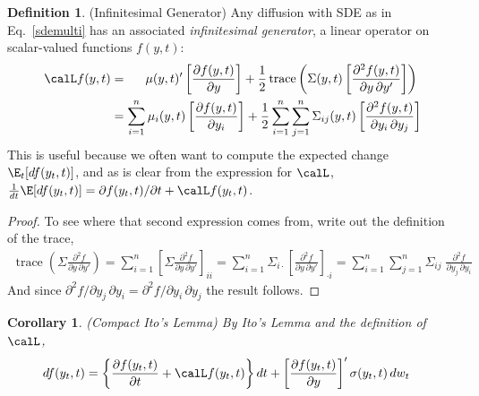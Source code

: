 \documentclass[12pt]{article}
\theoremstyle{plain}
\newtheorem{cor}[thm]{Corollary}
\theoremstyle{definition}
\newtheorem{defn}[thm]{Definition}
\theoremstyle{remark}
\newcommand{\trace}{\operatorname{trace}}
\newcommand{\sumin}{\sum^n_{i=1}}
\newcommand{\sumjn}{\sum^n_{j=1}}
\begin{document}
\begin{defn}(Infinitesimal Generator)
Any diffusion with SDE as in Eq.~\ref{sdemulti} has an associated
\emph{infinitesimal generator}, a linear operator on scalar-valued
functions $f(y,t)$:
\begin{align*}
  \calL f(y,t)
  &=
  \;\,\quad
  \mu(y,t)'
  \left[
  \frac{\partial f(y,t)}{\partial y}
  \right]
  +
  \frac{1}{2}
  \trace\left(
    \Sigma(y,t)
    \left[
    \frac{\partial^2 f(y,t)}{\partial y\,\partial y'}
    \right]
  \right)
  \\
  &=
  \sumin
  \mu_i(y,t)
  \left[
  \frac{\partial f(y,t)}{\partial y_i}
  \right]
  +
  \frac{1}{2}
  \sumin
  \sumjn
  \Sigma_{ij}(y,t)
  \left[
  \frac{\partial^2 f(y,t)}{\partial y_i\,\partial y_j}
  \right]
\end{align*}
This is useful because we often want to compute the expected change
$\E_t[df(y_t,t)]$, and as is clear from the expression for $\calL$,
$\frac{1}{dt}\E[df(y_t,t)]=\partial f(y_t,t)/\partial t+\calL f(y_t,t)$.
\end{defn}
\begin{proof}
To see where that second expression comes from, write out the definition
of the trace,
\begin{align*}
  \trace\left(
    \Sigma
    \frac{\partial^2 f}{\partial y\,\partial y'}
  \right)
  =
  \sum_{i=1}^n
  \left[
    \Sigma
    \frac{\partial^2 f}{\partial y\,\partial y'}
  \right]_{ii}
  =
  \sum_{i=1}^n
  \Sigma_{i\cdot}
  \left[
    \frac{\partial^2 f}{\partial y\,\partial y'}
  \right]_{\cdot i}
  =
  \sum_{i=1}^n
  \sum_{j=1}^n
  \Sigma_{ij}
  \;
  \frac{\partial^2 f}{\partial y_j\,\partial y_i}
\end{align*}
And since
$\partial^2 f/\partial y_j\,\partial y_i
=\partial^2 f/\partial y_i\,\partial y_j$
the result follows.
\end{proof}

\clearpage
\begin{cor}\emph{(Compact Ito's Lemma)}
\label{cor:ito}
By Ito's Lemma and the definition of $\calL$,
\begin{align*}
  df(y_t,t)
  &=
  \left\{
  \frac{\partial f(y_t,t)}{\partial t}
  +
  \calL f(y_t,t)
  \right\}
  dt
  +
  \left[
  \frac{\partial f(y_t,t)}{\partial y}
  \right]'
  \sigma(y_t,t)
  \,dw_t
  \notag
\end{align*}
\end{cor}
\end{document}
